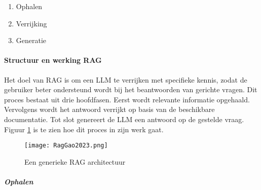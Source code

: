 \begin{enumerate}
    \item {Ophalen}
    \item {Verrijking}
    \item {Generatie}
\end{enumerate}

\paragraph{Structuur en werking RAG}

Het doel van RAG is om een LLM te verrijken met specifieke kennis, zodat de gebruiker beter ondersteund wordt bij het beantwoorden van gerichte vragen. Dit proces bestaat uit drie hoofdfasen. Eerst wordt relevante informatie opgehaald. Vervolgens wordt het antwoord verrijkt op basis van de beschikbare documentatie. Tot slot genereert de LLM een antwoord op de gestelde vraag. Figuur \ref{fig:Rag process} is te zien hoe dit proces in zijn werk gaat.

\begin{figure}[H]
    \centering
    \texttt{[image: RagGao2023.png]}
    \caption{Een generieke RAG architectuur \autocite{gao2024retrievalaugmentedgenerationlargelanguage}}
    \label{fig:Rag process}
\end{figure}

\subparagraph{Ophalen}
 
